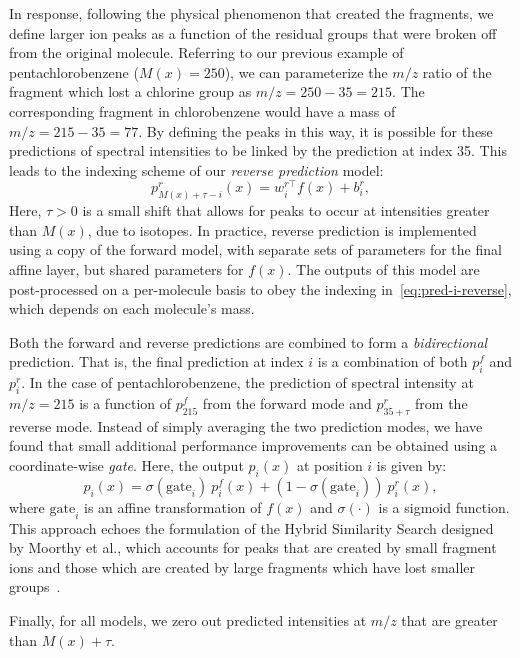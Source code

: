 In response, following the physical phenomenon that created the fragments, we define larger ion peaks as a function of the residual groups that were broken off from the original molecule.
Referring to our previous example of pentachlorobenzene ($M(x) = 250$), we can parameterize the $m/z$ ratio of the fragment which lost a chlorine group as $m/z = 250 - 35 = 215$. The corresponding fragment in chlorobenzene would have a mass of $m/z = 215 - 35 =  77$. By defining the peaks in this way, it is possible for these predictions of spectral intensities to be linked by the prediction at index 35.
This leads to the indexing scheme of our \textit{reverse prediction} model:
\begin{equation}
p^r_{M(x) + \tau - i}(x) = w^{r\top}_i f(x) + b^r_i, \label{eq:pred-i-reverse}
\end{equation}
Here, $\tau > 0$ is a small shift that allows for peaks to occur at intensities greater than $M(x)$, due to isotopes. In practice, reverse prediction is implemented using a copy of the forward model, with separate sets of parameters for the final affine layer, but shared parameters for $f(x)$. The outputs of this model are post-processed on a per-molecule basis to obey the indexing in~\eqref{eq:pred-i-reverse}, which depends on each molecule's mass.

Both the forward and reverse predictions are combined to form a \textit{bidirectional} prediction. That is, the final prediction at index $i$ is a combination of both $p^f_i$ and $p^r_i$. In the case of pentachlorobenzene, the prediction of spectral intensity at $m/z = 215$ is a function of $p^f_{215}$ from the forward mode and $p^r_{35 + \tau}$ from the reverse mode. Instead of simply averaging the two prediction modes, we have found that small additional performance improvements can be obtained using a coordinate-wise \textit{gate}. Here, the output $p_i(x)$ at position $i$ is given by:
\begin{equation}\label{eq:sigmoid_gate}
p_i(x) = \sigma(\text{gate}_i) ~ p^f_i(x) + (1 - \sigma(\text{gate}_i)) ~ p^r_{i}(x),
\end{equation}
where $\text{gate}_i$ is an affine transformation of $f(x)$ and $\sigma(\cdot)$ is a sigmoid function. This approach echoes the formulation of the Hybrid Similarity Search designed by Moorthy et al., which accounts for peaks that are created by small fragment ions and those which are created by large fragments which have lost smaller groups~\cite{moorthy2017combining}.

Finally, for all models, we zero out predicted intensities at $m/z$ that are greater than $M(x) + \tau$.

